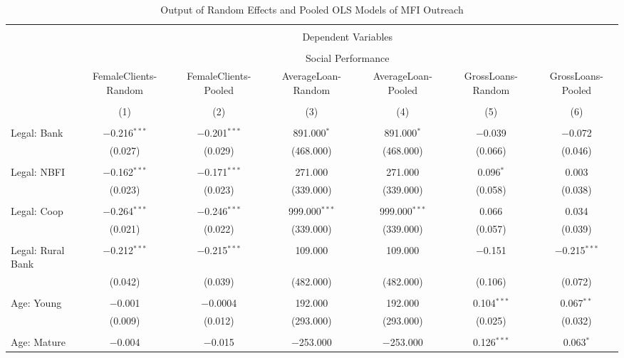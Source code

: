 \documentclass[a4paper,nobind]{templates/ociamthesis}
\begin{document}
\begin{landscape}
\begin{table}[!htbp] \centering 
  \caption{Output of Random Effects and Pooled OLS Models of MFI Outreach} 
  \label{} 
\footnotesize 
\begin{tabular}{@{\extracolsep{5pt}}lcccccc} 
\\[-1.8ex]\hline 
\hline \\[-1.8ex] 
 & \multicolumn{6}{c}{Dependent Variables} \\ 
\cline{2-7} 
\\[-1.8ex] & \multicolumn{6}{c}{Social Performance} \\ 
 & FemaleClients-Random & FemaleClients-Pooled & AverageLoan- Random & AverageLoan- Pooled & GrossLoans- Random & GrossLoans- Pooled \\ 
\\[-1.8ex] & (1) & (2) & (3) & (4) & (5) & (6)\\ 
\hline \\[-1.8ex] 
 Legal: Bank & $-$0.216$^{***}$ & $-$0.201$^{***}$ & 891.000$^{*}$ & 891.000$^{*}$ & $-$0.039 & $-$0.072 \\ 
  & (0.027) & (0.029) & (468.000) & (468.000) & (0.066) & (0.046) \\ 
  & & & & & & \\ 
 Legal: NBFI & $-$0.162$^{***}$ & $-$0.171$^{***}$ & 271.000 & 271.000 & 0.096$^{*}$ & 0.003 \\ 
  & (0.023) & (0.023) & (339.000) & (339.000) & (0.058) & (0.038) \\ 
  & & & & & & \\ 
 Legal: Coop & $-$0.264$^{***}$ & $-$0.246$^{***}$ & 999.000$^{***}$ & 999.000$^{***}$ & 0.066 & 0.034 \\ 
  & (0.021) & (0.022) & (339.000) & (339.000) & (0.057) & (0.039) \\ 
  & & & & & & \\ 
 Legal: Rural Bank & $-$0.212$^{***}$ & $-$0.215$^{***}$ & 109.000 & 109.000 & $-$0.151 & $-$0.215$^{***}$ \\ 
  & (0.042) & (0.039) & (482.000) & (482.000) & (0.106) & (0.072) \\ 
  & & & & & & \\ 
 Age: Young & $-$0.001 & $-$0.0004 & 192.000 & 192.000 & 0.104$^{***}$ & 0.067$^{**}$ \\ 
  & (0.009) & (0.012) & (293.000) & (293.000) & (0.025) & (0.032) \\ 
  & & & & & & \\ 
 Age: Mature & $-$0.004 & $-$0.015 & $-$253.000 & $-$253.000 & 0.126$^{***}$ & 0.063$^{*}$ \\ 

\end{tabular}
\end{table}
\end{landscape}
\end{document}
